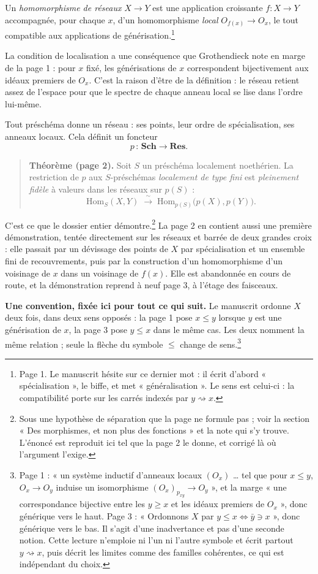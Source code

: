 \documentclass[11pt,a4paper]{article}
\begin{document}
Un \emph{homomorphisme de réseaux} $X \to Y$ est une application croissante
$f : X \to Y$ accompagnée, pour chaque $x$, d'un homomorphisme \emph{local}
$O_{f(x)} \to O_x$, le tout compatible aux applications de
générisation.\footnote{Page 1. Le manuscrit hésite sur ce dernier mot : il
écrit d'abord « spécialisation », le biffe, et met « généralisation ». Le sens
est celui-ci : la compatibilité porte sur les carrés indexés par
$y \rightsquigarrow x$.}

La condition de localisation a une conséquence que Grothendieck note en marge
de la page 1 : pour $x$ fixé, les générisations de $x$ correspondent
bijectivement aux idéaux premiers de $O_x$. C'est la raison d'être de la
définition : le réseau retient assez de l'espace pour que le spectre de
chaque anneau local se lise dans l'ordre lui-même.

Tout préschéma donne un réseau : ses points, leur ordre de spécialisation, ses
anneaux locaux. Cela définit un foncteur
\[ p \,:\, \mathbf{Sch} \longrightarrow \mathbf{Res}. \]

\begin{quote}
\textbf{Théorème (page 2).} Soit $S$ un préschéma localement noethérien. La
restriction de $p$ aux $S$-préschémas \emph{localement de type fini} est
\emph{pleinement fidèle} à valeurs dans les réseaux sur $p(S)$ :
\[ \mathrm{Hom}_S(X, Y) \;\xrightarrow{\ \sim\ }\;
   \mathrm{Hom}_{p(S)}\bigl(p(X), p(Y)\bigr). \]
\end{quote}

C'est ce que le dossier entier démontre.\footnote{Sous une hypothèse de
séparation que la page ne formule pas ; voir la section « Des morphismes, et
non plus des fonctions » et la note qui s'y trouve. L'énoncé est reproduit
ici tel que la page 2 le donne, et corrigé là où l'argument l'exige.} La
page 2 en contient aussi une première démonstration, tentée directement sur
les réseaux et barrée de deux grandes croix : elle passait par un dévissage
des points de $X$ par spécialisation et un ensemble fini de recouvrements,
puis par la construction d'un homomorphisme d'un voisinage de $x$ dans un
voisinage de $f(x)$. Elle est abandonnée en cours de route, et la
démonstration reprend à neuf page 3, à l'étage des faisceaux.

\textbf{Une convention, fixée ici pour tout ce qui suit.} Le manuscrit ordonne
$X$ deux fois, dans deux sens opposés : la page 1 pose $x \leq y$ lorsque $y$
est une générisation de $x$, la page 3 pose $y \leq x$ dans le même cas. Les
deux nomment la même relation ; seule la flèche du symbole $\leq$ change de
sens.\footnote{Page 1 : « un système inductif d'anneaux locaux
$(O_x)$ … tel que pour $x \leq y$, $O_x \to O_y$ induise un isomorphisme
$(O_x)_{p_{xy}} \to O_y$ », et la marge « une correspondance bijective entre
les $y \geq x$ et les idéaux premiers de $O_x$ », donc générique vers le
haut. Page 3 : « Ordonnons $X$ par $y \leq x \Leftrightarrow \bar y \ni x$ »,
donc générique vers le bas. Il s'agit d'une inadvertance et pas d'une seconde
notion. Cette lecture n'emploie ni l'un ni l'autre symbole et écrit partout
$y \rightsquigarrow x$, puis décrit les limites comme des familles cohérentes,
ce qui est indépendant du choix.}
\end{document}
